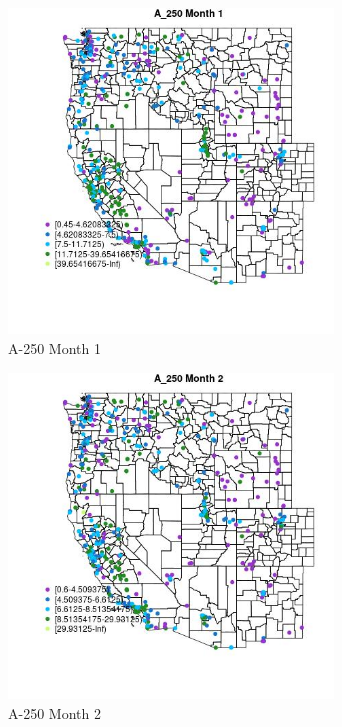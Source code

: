 \begin{figure} 
\centering  
\includegraphics[width=0.77\textwidth]{Code_Outputs/ML_input_report_ML_input_PM25_Step5_part_d_de_duplicated_aves_ML_input_MapObsMo1A_250.jpg} 
\caption{\label{fig:ML_input_report_ML_input_PM25_Step5_part_d_de_duplicated_aves_ML_inputMapObsMo1A_250}A-250 Month 1} 
\end{figure} 
 

\clearpage 

\begin{figure} 
\centering  
\includegraphics[width=0.77\textwidth]{Code_Outputs/ML_input_report_ML_input_PM25_Step5_part_d_de_duplicated_aves_ML_input_MapObsMo2A_250.jpg} 
\caption{\label{fig:ML_input_report_ML_input_PM25_Step5_part_d_de_duplicated_aves_ML_inputMapObsMo2A_250}A-250 Month 2} 
\end{figure} 
 

